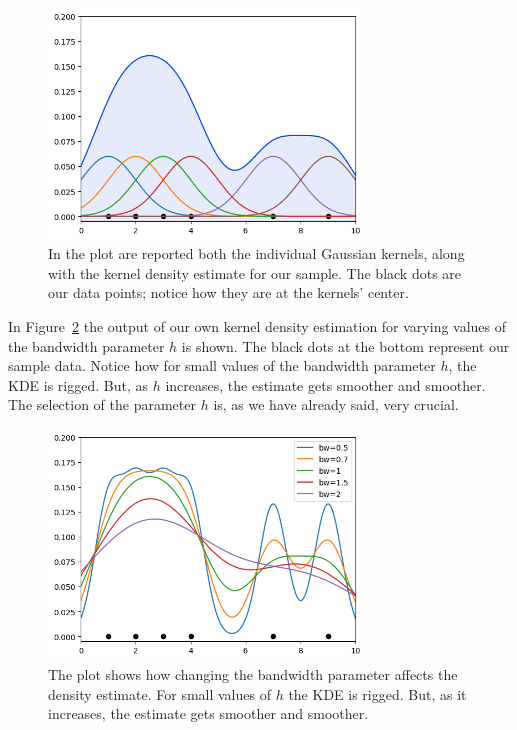 \begin{figure}[htb]
\centering
\includegraphics[width=0.75\textwidth]{figures/kde_one_variable}
\caption{In the plot are reported both the individual Gaussian kernels, along with the kernel density estimate for our sample. The black dots are our data points; notice how they are at the kernels' center.}
\label{fig:kde_one_variable}
\end{figure}

In Figure~\ref{fig:kde_bandwidth} the output of our own kernel density estimation for varying values of the bandwidth parameter $h$ is shown. The black dots at the bottom represent our sample data. Notice how for small values of the bandwidth parameter $h$, the KDE is rigged. But, as $h$ increases, the estimate gets smoother and smoother. The selection of the parameter $h$ is, as we have already said, very crucial.


\begin{figure}[htb]
\centering
\includegraphics[width=0.75\textwidth]{figures/kde_bandwidth}
\caption{The plot shows how changing the bandwidth parameter affects the density estimate. For small values of $h$ the KDE is rigged. But, as it increases, the estimate gets smoother and smoother.}
\label{fig:kde_bandwidth}
\end{figure}

